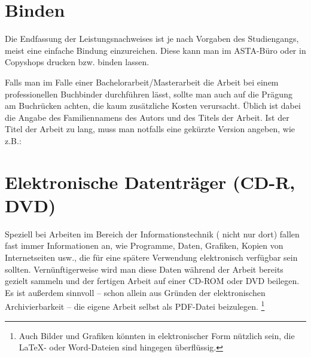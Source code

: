 \section{Binden}

Die Endfassung der Leistungsnachweises ist je nach Vorgaben des Studiengangs, meist eine einfache Bindung einzureichen. Diese kann man im ASTA-Büro oder in Copyshops drucken bzw. binden lassen.

Falls man im Falle einer Bachelorarbeit/Masterarbeit die Arbeit bei einem
professionellen Buchbinder durchführen lässt, sollte man auch auf
die Prägung am Buchrücken achten, die kaum zusätzliche Kosten
verursacht. Üblich ist dabei die Angabe des Familiennamens des
Autors und des Titels der Arbeit. Ist der Titel der Arbeit zu
lang, muss man notfalls eine gekürzte  Version angeben, wie z.B.:
%
\begin{center}
\setlength{\fboxsep}{3mm}
\end{center}
%



\section{Elektronische Datenträger (CD-R, DVD)}
Speziell bei Arbeiten im Bereich der Informationstechnik (
nicht nur dort) fallen fast immer Informationen an, wie Programme,
Daten, Grafiken, Kopien von Internetseiten usw., die für eine
spätere Verwendung elektronisch verfügbar sein sollten.
Vernünftigerweise wird man diese Daten während der Arbeit bereits
gezielt sammeln und der fertigen Arbeit auf einer CD-ROM oder DVD
beilegen. Es ist außerdem sinnvoll -- schon allein aus Gründen der
elektronischen Archivierbarkeit -- die eigene Arbeit selbst als
PDF-Datei beizulegen.%
\footnote{Auch Bilder und Grafiken könnten in elektronischer Form nützlich
sein, die LaTeX- oder Word-Dateien sind hingegen überflüssig.}


